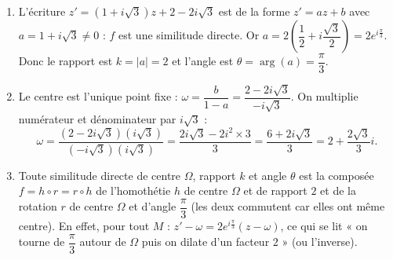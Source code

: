 \documentclass[11pt]{article}
\newcommand{\cle}[1]{{\popxbold\color{popdark}#1}}
\begin{document}
\begin{corrige}
\begin{enumerate}
\item L'écriture $z' = (1+i\sqrt{3})z + 2 - 2i\sqrt{3}$ est de la forme $z' = az + b$ avec $a = 1 + i\sqrt{3} \neq 0$ : $f$ est une \cle{similitude directe}. Or $a = 2\left(\dfrac{1}{2} + i\dfrac{\sqrt{3}}{2}\right) = 2e^{i\frac{\pi}{3}}$. Donc le rapport est $k = |a| = 2$ et l'angle est $\theta = \arg(a) = \dfrac{\pi}{3}$.
\item Le centre est l'unique point fixe : $\omega = \dfrac{b}{1-a} = \dfrac{2 - 2i\sqrt{3}}{-i\sqrt{3}}$. On multiplie numérateur et dénominateur par $i\sqrt{3}$ :
\[ \omega = \frac{(2 - 2i\sqrt{3})(i\sqrt{3})}{(-i\sqrt{3})(i\sqrt{3})} = \frac{2i\sqrt{3} - 2i^2 \times 3}{3} = \frac{6 + 2i\sqrt{3}}{3} = 2 + \frac{2\sqrt{3}}{3}i. \]
\item Toute similitude directe de centre $\Omega$, rapport $k$ et angle $\theta$ est la composée $f = h \circ r = r \circ h$ de l'homothétie $h$ de centre $\Omega$ et de rapport $2$ et de la rotation $r$ de centre $\Omega$ et d'angle $\dfrac{\pi}{3}$ (les deux commutent car elles ont même centre). En effet, pour tout $M$ : $z' - \omega = 2e^{i\frac{\pi}{3}}(z - \omega)$, ce qui se lit « on tourne de $\dfrac{\pi}{3}$ autour de $\Omega$ puis on dilate d'un facteur $2$ » (ou l'inverse).
\end{enumerate}
\end{corrige}
\end{document}
